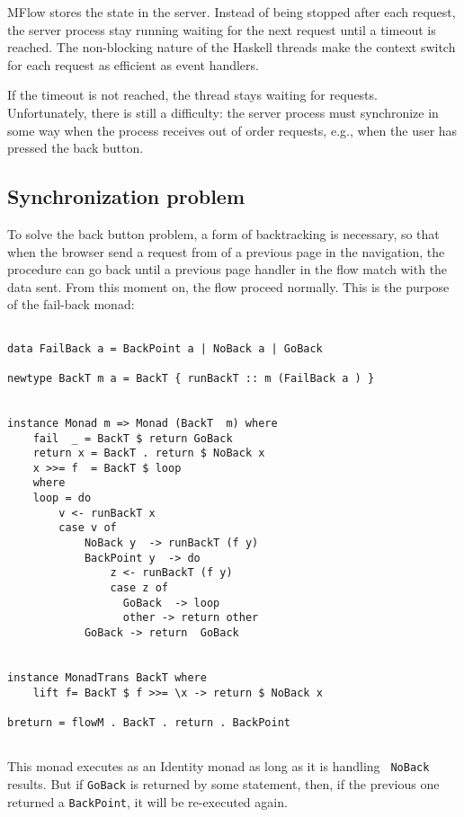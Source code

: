 \documentclass{tmr}
\begin{document}
MFlow stores the state in the server. Instead of being stopped after each request, the server process stay running waiting for the next request until a timeout is reached. The non-blocking nature of the Haskell threads make the context switch for each request as efficient as event handlers. 

If the timeout is not reached, the thread stays waiting for requests. Unfortunately, there is still a difficulty: the server process must synchronize in some way when the process receives out of order requests, e.g., when the user has pressed the back button. 
 
\subsection{Synchronization problem} 
To solve the back button problem, a form of backtracking is necessary, so that when the browser send a request from of a previous page in the navigation, the procedure can go back until a previous page handler in the flow match with the data sent. From this moment on, the flow proceed normally. This is the purpose of the fail-back monad: 
 
{\tt 
 
\begin{verbatim} 
 
data FailBack a = BackPoint a | NoBack a | GoBack 
 
newtype BackT m a = BackT { runBackT :: m (FailBack a ) } 
 
 
instance Monad m => Monad (BackT  m) where 
    fail  _ = BackT $ return GoBack 
    return x = BackT . return $ NoBack x 
    x >>= f  = BackT $ loop 
    where 
    loop = do 
        v <- runBackT x 
        case v of 
            NoBack y  -> runBackT (f y) 
            BackPoint y  -> do 
                z <- runBackT (f y) 
                case z of 
                  GoBack  -> loop 
                  other -> return other 
            GoBack -> return  GoBack 
 
 
instance MonadTrans BackT where 
    lift f= BackT $ f >>= \x -> return $ NoBack x 
 
breturn = flowM . BackT . return . BackPoint 
 
\end{verbatim} 
 
} 
 
This monad executes as an Identity monad as long as it is handling {\tt 
NoBack} results. But if {\tt GoBack} is returned by some statement, then, if the previous one returned a {\tt BackPoint}, it will be re-executed again. 
\end{document}
